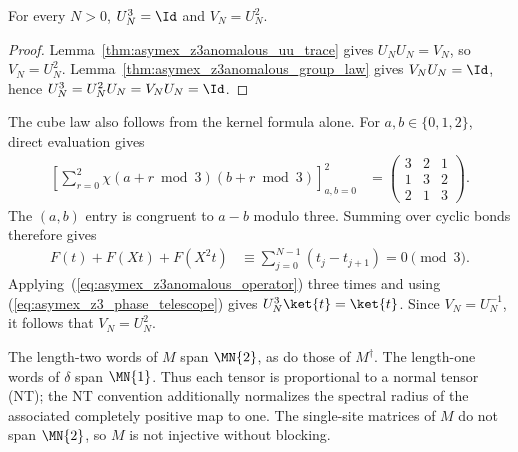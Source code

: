 \begin{lemma}
    \label{lem:asymex_z3_physical_cube}
    \leanok
    For every $N>0$, $U_N^3=\Id$ and $V_N=U_N^2$.
\end{lemma}

\begin{proof}
    \leanok
    Lemma~\ref{thm:asymex_z3anomalous_uu_trace} gives $U_NU_N=V_N$, so
    $V_N=U_N^2$. Lemma~\ref{thm:asymex_z3anomalous_group_law} gives
    $V_NU_N=\Id$, hence $U_N^3=U_N^2U_N=V_NU_N=\Id$.
\end{proof}

\begin{remark}
    \label{rem:asymex_z3_physical_cube_direct}
    The cube law also follows from the kernel formula alone.
    For $a,b\in\{0,1,2\}$, direct evaluation gives
    \begin{align}
        \left[\sum_{r=0}^{2}\chi(a+r\bmod3)(b+r\bmod3)\right]_{a,b=0}^{2}
         & =\begin{pmatrix}3&2&1\\1&3&2\\2&1&3\end{pmatrix}.
    \end{align}
    The $(a,b)$ entry is congruent to $a-b$ modulo three.
    Summing over cyclic bonds therefore gives
    \begin{align}
        F(t)+F(Xt)+F(X^2t)
         & \equiv\sum_{j=0}^{N-1}(t_j-t_{j+1})
        =0\pmod3.
        \label{eq:asymex_z3_phase_telescope}
    \end{align}
    Applying~(\ref{eq:asymex_z3anomalous_operator}) three times and using
    (\ref{eq:asymex_z3_phase_telescope}) gives
    $U_N^3\ket{t}=\ket{t}$. Since $V_N=U_N^{-1}$, it follows that
    $V_N=U_N^2$.
\end{remark}

\begin{lemma}
    \label{thm:asymex_z3anomalous_normal}
    \leanok
    The length-two words of $M$ span $\MN{2}$, as do those of $M^\dagger$.
    The length-one words of $\delta$ span $\MN{1}$. Thus each tensor is proportional
    to a normal tensor (NT); the NT convention additionally normalizes the spectral
    radius of the associated completely positive map to one.
    The single-site matrices of $M$ do not span $\MN{2}$, so $M$ is not
    injective without blocking.
\end{lemma}

